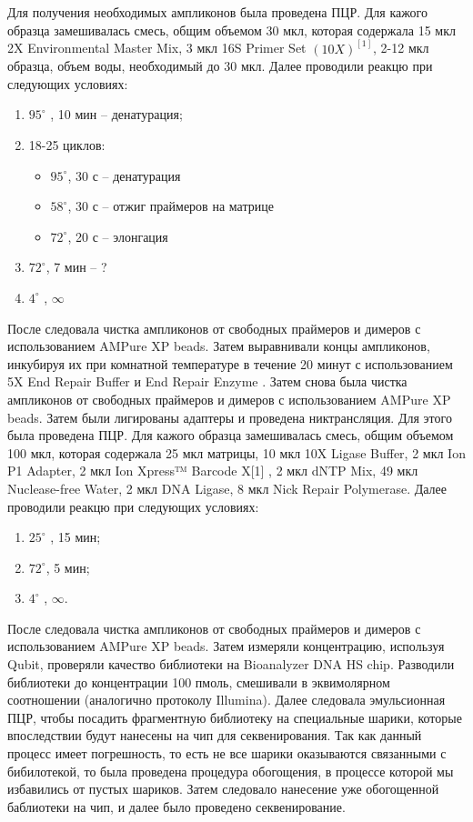 Для получения необходимых ампликонов была проведена ПЦР. Для кажого образца замешивалась смесь, общим объемом 30 мкл, которая содержала 15 мкл 2X Environmental Master Mix, 3 мкл 16S Primer Set $(10X)^{[1]}$, 2-12 мкл образца, объем воды, необходимый до 30 мкл.  Далее проводили реакцю при следующих условиях:

\begin{enumerate}
	\item $95^{\circ}$ , 10 мин – денатурация;
	\item 18-25 циклов:
	\begin{itemize}
		\item $95^{\circ}$, 30 с – денатурация
		\item $58^{\circ}$, 30 с – отжиг праймеров на матрице
		\item $72^{\circ}$, 20 с – элонгация
	\end{itemize}
	\item $72^{\circ}$, 7 мин – ?
	\item $4^{\circ}$ ,  $\infty$
\end{enumerate}

После следовала чистка ампликонов от свободных праймеров и димеров с использованием AMPure XP beads. Затем выравнивали концы ампликонов, инкубируя их при комнатной температуре в течение 20 минут с использованием 5X End Repair Buffer и End Repair Enzyme . Затем снова была чистка ампликонов от свободных праймеров и димеров с использованием AMPure XP beads. Затем были лигированы адаптеры и проведена никтрансляция. Для этого была проведена ПЦР. Для кажого образца замешивалась смесь, общим объемом 100 мкл, которая содержала 25 мкл матрицы, 10 мкл 10X Ligase Buffer, 2 мкл Ion P1 Adapter, 2 мкл Ion Xpress™ Barcode X[1] , 2 мкл dNTP Mix, 49 мкл Nuclease-free Water, 2 мкл DNA Ligase, 8 мкл Nick Repair Polymerase.   Далее проводили реакцю при следующих условиях:

\begin{enumerate}
	\item $25^{\circ}$ , 15 мин;
	\item $72^{\circ}$, 5 мин;
	\item $4^{\circ}$ ,  $\infty$.
\end{enumerate}

После следовала чистка ампликонов от свободных праймеров и димеров с использованием AMPure XP beads. Затем измеряли концентрацию, используя Qubit, проверяли качество библиотеки на Bioanalyzer DNA HS chip. Разводили библиотеки до концентрации 100 пмоль, смешивали в эквимолярном соотношении (аналогично протоколу Illumina). Далее следовала эмульсионная ПЦР, чтобы посадить фрагментную библиотеку на специальные шарики, которые впоследствии будут нанесены на чип для секвенирования. Так как данный процесс имеет погрешность, то есть не все шарики оказываются связанными с бибилотекой, то была проведена процедура обогощения, в процессе которой мы избавились от пустых шариков. Затем следовало нанесение уже обогощенной баблиотеки на чип, и далее было проведено секвенирование.




